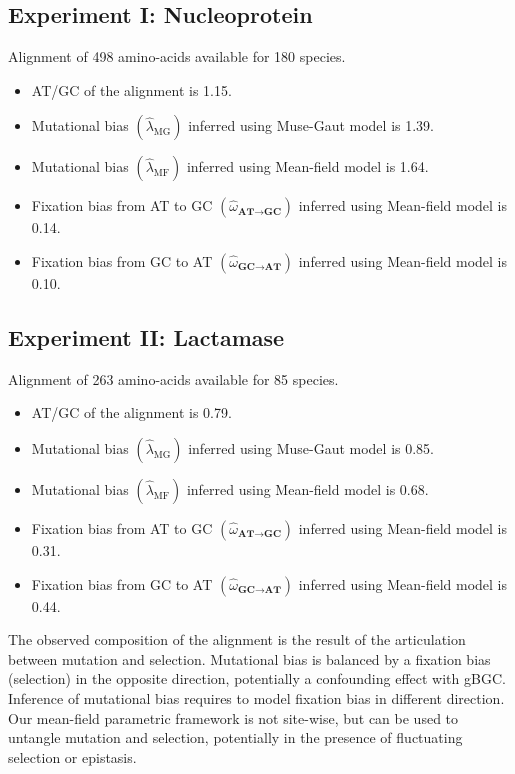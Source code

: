 \subsection{Experiment I: Nucleoprotein}
Alignment of 498 amino-acids available for 180 species.
\begin{itemize}
	\item AT/GC of the alignment is 1.15.
	\item Mutational bias $\left({\widehat{\lambda}_{\text{MG}}} \right)$ inferred using Muse-Gaut model is 1.39.
	\item Mutational bias $\left({\widehat{\lambda}_{\text{MF}}} \right)$ inferred using Mean-field model is 1.64.
	\item Fixation bias from AT to GC $\left(\widehat{\omega}_{\textbf{AT} \rightarrow \textbf{GC}}\right)$ inferred using Mean-field model is 0.14.
	\item Fixation bias from GC to AT $\left(\widehat{\omega}_{\textbf{GC} \rightarrow \textbf{AT}}\right)$ inferred using Mean-field model is 0.10.
\end{itemize}
\subsection{Experiment II: Lactamase}
Alignment of 263 amino-acids available for 85 species.
\begin{itemize}
	\item AT/GC of the alignment is 0.79.
	\item Mutational bias $\left({\widehat{\lambda}_{\text{MG}}} \right)$ inferred using Muse-Gaut model is 0.85.
	\item Mutational bias $\left({\widehat{\lambda}_{\text{MF}}} \right)$ inferred using Mean-field model is 0.68.
	\item Fixation bias from AT to GC $\left(\widehat{\omega}_{\textbf{AT} \rightarrow \textbf{GC}}\right)$ inferred using Mean-field model is 0.31.
	\item Fixation bias from GC to AT $\left(\widehat{\omega}_{\textbf{GC} \rightarrow \textbf{AT}}\right)$ inferred using Mean-field model is 0.44.
\end{itemize}

The observed composition of the alignment is the result of the articulation between mutation and selection.
Mutational bias is balanced by a fixation bias (selection) in the opposite direction, potentially a confounding effect with gBGC.
Inference of mutational bias requires to model fixation bias in different direction.
Our mean-field parametric framework is not site-wise, but can be used to untangle mutation and selection, potentially in the presence of fluctuating selection or epistasis.
